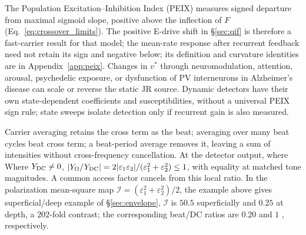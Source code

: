\documentclass[11pt,a4paper]{article}
\providecommand{\DIFaddtex}[1]{{\protect\color{blue} \sf #1}} %
\providecommand{\DIFdeltex}[1]{{\protect\color{red} \scriptsize #1}} %
\providecommand{\DIFaddbegin}{} %
\providecommand{\DIFaddend}{} %
\providecommand{\DIFdelbegin}{} %
\providecommand{\DIFdelend}{} %
\providecommand{\DIFadd}[1]{\texorpdfstring{\DIFaddtex{#1}}{#1}} %
\providecommand{\DIFdel}[1]{\texorpdfstring{\DIFdeltex{#1}}{}} %
\begin{document}
\label{sec:opp}
\DIFadd{The Population Excitation--Inhibition Index (PEIX) \cite{ruffini2025cfc}
measures signed departure from maximal sigmoid slope, positive }\DIFaddend above the
inflection \DIFdelbegin \DIFdel{of $F$ (Eq.~\eqref{eq:crossover_limits}). The positive
E-drive shift in \S\ref{sec:qif} is therefore a fast-carrier result for that
model; the mean-rate response after recurrent
feedback need not retain its sign}\DIFdelend \DIFaddbegin \DIFadd{and negative below; its definition and curvature identities are
in Appendix~\ref{app:peix}. Changes in $v^*$ through neuromodulation,
attention, arousal, psychedelic exposure, or dysfunction of PV interneurons
in Alzheimer's disease can scale or reverse the static JR source.
Dynamic detectors have their own state-dependent coefficients and susceptibilities, without
a universal PEIX sign rule; state sweeps isolate detection only if recurrent
gain is also measured}\DIFaddend .

Carrier averaging retains the \DIFdelbegin \DIFdel{cross term as the beat; averaging over many beat cycles }\DIFdelend \DIFaddbegin \DIFadd{beat cross term; a beat-period average }\DIFaddend removes
it, leaving \DIFdelbegin \DIFdel{a sum of }\DIFdelend intensities without cross-frequency cancellation. \DIFdelbegin \DIFdel{At the detector output, where }\DIFdelend \DIFaddbegin \DIFadd{Where
}\DIFaddend $Y_{\rm DC}\ne0$,
$|Y_\Omega/Y_{\rm DC}|=2|\varepsilon_1\varepsilon_2|/
(\varepsilon_1^2+\varepsilon_2^2)\le1$, with equality at matched \DIFdelbegin \DIFdel{tone }\DIFdelend magnitudes.
A common access factor cancels\DIFdelbegin \DIFdel{from this local ratio}\DIFdelend . In the \DIFdelbegin \DIFdel{polarization
mean-square map $\mathcal I=(\varepsilon_1^2+\varepsilon_2^2)/2$, the example above gives }\DIFdelend \DIFaddbegin \DIFadd{superficial/deep example of \S\ref{sec:envelope}, $\mathcal I$ is
}\DIFaddend $50.5$ superficially and $0.25$ at depth, a $202$-fold contrast;
the \DIFaddbegin \DIFadd{corresponding }\DIFaddend beat/DC ratios are $0.20$ and $1$\DIFdelbegin \DIFdel{, respectively}\DIFdelend .
\end{document}
